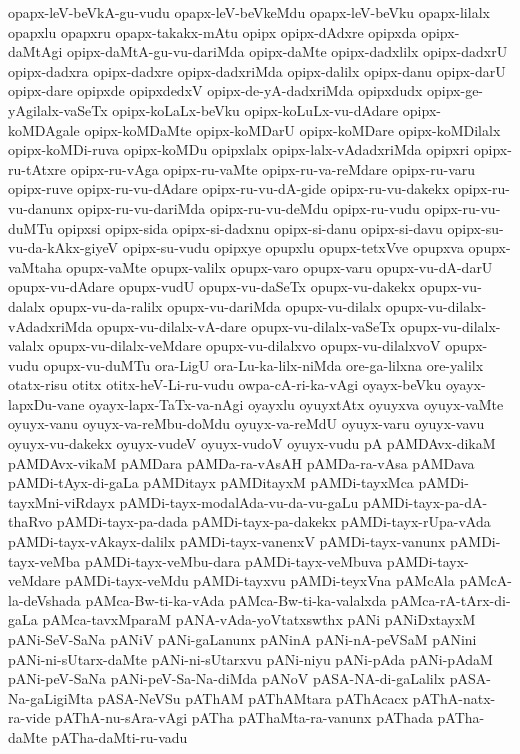 {opapx-leV-beVkA-gu-vudu
opapx-leV-beVkeMdu
opapx-leV-beVku
opapx-lilalx
opapxlu
opapxru
opapx-takakx-mAtu
opipx
opipx-dAdxre
opipxda
opipx-daMtAgi
opipx-daMtA-gu-vu-dariMda
opipx-daMte
opipx-dadxlilx
opipx-dadxrU
opipx-dadxra
opipx-dadxre
opipx-dadxriMda
opipx-dalilx
opipx-danu
opipx-darU
opipx-dare
opipxde
opipxdedxV
opipx-de-yA-dadxriMda
opipxdudx
opipx-ge-yAgilalx-vaSeTx
opipx-koLaLx-beVku
opipx-koLuLx-vu-dAdare
opipx-koMDAgale
opipx-koMDaMte
opipx-koMDarU
opipx-koMDare
opipx-koMDilalx
opipx-koMDi-ruva
opipx-koMDu
opipxlalx
opipx-lalx-vAdadxriMda
opipxri
opipx-ru-tAtxre
opipx-ru-vAga
opipx-ru-vaMte
opipx-ru-va-reMdare
opipx-ru-varu
opipx-ruve
opipx-ru-vu-dAdare
opipx-ru-vu-dA-gide
opipx-ru-vu-dakekx
opipx-ru-vu-danunx
opipx-ru-vu-dariMda
opipx-ru-vu-deMdu
opipx-ru-vudu
opipx-ru-vu-duMTu
opipxsi
opipx-sida
opipx-si-dadxnu
opipx-si-danu
opipx-si-davu
opipx-su-vu-da-kAkx-giyeV
opipx-su-vudu
opipxye
opupxlu
opupx-tetxVve
opupxva
opupx-vaMtaha
opupx-vaMte
opupx-valilx
opupx-varo
opupx-varu
opupx-vu-dA-darU
opupx-vu-dAdare
opupx-vudU
opupx-vu-daSeTx
opupx-vu-dakekx
opupx-vu-dalalx
opupx-vu-da-ralilx
opupx-vu-dariMda
opupx-vu-dilalx
opupx-vu-dilalx-vAdadxriMda
opupx-vu-dilalx-vA-dare
opupx-vu-dilalx-vaSeTx
opupx-vu-dilalx-valalx
opupx-vu-dilalx-veMdare
opupx-vu-dilalxvo
opupx-vu-dilalxvoV
opupx-vudu
opupx-vu-duMTu
ora-LigU
ora-Lu-ka-lilx-niMda
ore-ga-lilxna
ore-yalilx
otatx-risu
otitx
otitx-heV-Li-ru-vudu
owpa-cA-ri-ka-vAgi
oyayx-beVku
oyayx-lapxDu-vane
oyayx-lapx-TaTx-va-nAgi
oyayxlu
oyuyxtAtx
oyuyxva
oyuyx-vaMte
oyuyx-vanu
oyuyx-va-reMbu-doMdu
oyuyx-va-reMdU
oyuyx-varu
oyuyx-vavu
oyuyx-vu-dakekx
oyuyx-vudeV
oyuyx-vudoV
oyuyx-vudu
pA
pAMDAvx-dikaM
pAMDAvx-vikaM
pAMDara
pAMDa-ra-vAsAH
pAMDa-ra-vAsa
pAMDava
pAMDi-tAyx-di-gaLa
pAMDitayx
pAMDitayxM
pAMDi-tayxMca
pAMDi-tayxMni-viRdayx
pAMDi-tayx-modalAda-vu-da-vu-gaLu
pAMDi-tayx-pa-dA-thaRvo
pAMDi-tayx-pa-dada
pAMDi-tayx-pa-dakekx
pAMDi-tayx-rUpa-vAda
pAMDi-tayx-vAkayx-dalilx
pAMDi-tayx-vanenxV
pAMDi-tayx-vanunx
pAMDi-tayx-veMba
pAMDi-tayx-veMbu-dara
pAMDi-tayx-veMbuva
pAMDi-tayx-veMdare
pAMDi-tayx-veMdu
pAMDi-tayxvu
pAMDi-teyxVna
pAMcAla
pAMcA-la-deVshada
pAMca-Bw-ti-ka-vAda
pAMca-Bw-ti-ka-valalxda
pAMca-rA-tArx-di-gaLa
pAMca-tavxMparaM
pANA-vAda-yoVtatxswthx
pANi
pANiDxtayxM
pANi-SeV-SaNa
pANiV
pANi-gaLanunx
pANinA
pANi-nA-peVSaM
pANini
pANi-ni-sUtarx-daMte
pANi-ni-sUtarxvu
pANi-niyu
pANi-pAda
pANi-pAdaM
pANi-peV-SaNa
pANi-peV-Sa-Na-diMda
pANoV
pASA-NA-di-gaLalilx
pASA-Na-gaLigiMta
pASA-NeVSu
pAThAM
pAThAMtara
pAThAcacx
pAThA-natx-ra-vide
pAThA-nu-sAra-vAgi
pATha
pAThaMta-ra-vanunx
pAThada
pATha-daMte
pATha-daMti-ru-vadu
}
